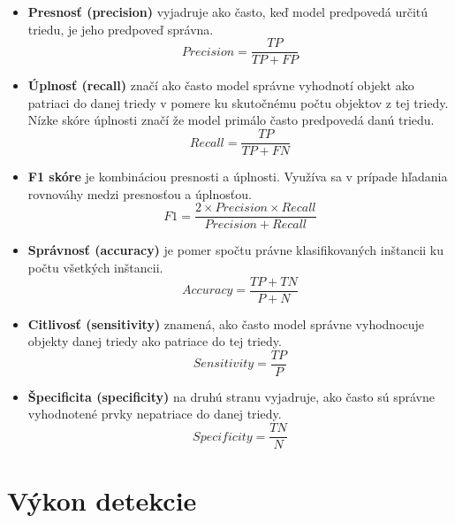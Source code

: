             \begin{itemize}
                \item \textbf{Presnosť (precision)} vyjadruje ako často, keď model predpovedá určitú triedu, je jeho predpoveď správna.
                \begin{equation}
                    Precision = \frac{TP}{TP + FP}
                \end{equation}
                \item \textbf{Úplnosť (recall)} značí ako často model správne vyhodnotí objekt ako patriaci do danej triedy v pomere ku skutočnému počtu objektov z tej triedy. Nízke skóre úplnosti značí že model primálo často predpovedá danú triedu.
                \begin{equation}
                    Recall = \frac{TP}{TP + FN}
                \end{equation}
                \item \textbf{F1 skóre} je kombináciou presnosti a úplnosti. Využíva sa v prípade hľadania rovnováhy medzi presnosťou a úplnosťou.
                \begin{equation}
                    F1 = \frac{2 \times Precision \times Recall}{Precision + Recall}
                \end{equation}
                \item \textbf{Správnosť (accuracy)} je pomer spočtu právne klasifikovaných inštancii ku počtu všetkých inštancii.
                \begin{equation}
                    Accuracy = \frac{TP + TN}{P + N}
                \end{equation}
                \item \textbf{Citlivosť (sensitivity)} znamená, ako často model správne vyhodnocuje objekty danej triedy ako patriace do tej triedy.
                \begin{equation}
                    Sensitivity = \frac{TP}{P}
                \end{equation}
                \item \textbf{Špecificita (specificity)} na druhú stranu vyjadruje, ako často sú správne vyhodnotené prvky nepatriace do danej triedy.
                \begin{equation}
                    Specificity = \frac{TN}{N}
                \end{equation}
            \end{itemize}

    \section{Výkon detekcie}
